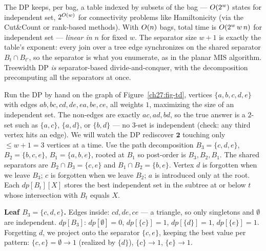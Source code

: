 \begin{complexitybox}
The DP keeps, per bag, a table indexed by subsets of the bag --- $O(2^{w})$ states for independent set, $2^{O(w)}$ for connectivity problems like Hamiltonicity (via the Cut\&Count or rank-based methods). With $O(n)$ bags, total time is $O(2^{w}\,w\,n)$ for independent set --- \emph{linear in $n$} for fixed $w$. The separator size $w+1$ is exactly the table's exponent: every join over a tree edge synchronizes on the shared separator $B_t\cap B_{t'}$, so the separator is what you enumerate, as in the planar MIS algorithm. Treewidth DP \emph{is} separator-based divide-and-conquer, with the decomposition precomputing all the separators at once.
\end{complexitybox}

\begin{labbox}
Run the DP by hand on the graph of Figure~\ref{ch27:fig-td}, vertices $\{a,b,c,d,e\}$ with edges $ab,bc,cd,de,ea,be,ce$, all weights $1$, maximizing the size of an independent set. The non-edges are exactly $ac,ad,bd$, so the true answer is a $2$-set such as $\{a,c\}$, $\{a,d\}$, or $\{b,d\}$ --- no $3$-set is independent (check: any third vertex hits an edge). We will watch the DP rediscover $\mathbf 2$ touching only $\le w+1=3$ vertices at a time. Use the path decomposition $B_3=\{c,d,e\}$, $B_2=\{b,c,e\}$, $B_1=\{a,b,e\}$, rooted at $B_1$ so post-order is $B_3,B_2,B_1$. The shared separators are $B_2\cap B_3=\{c,e\}$ and $B_1\cap B_2=\{b,e\}$. Vertex $d$ is forgotten when we leave $B_3$; $c$ is forgotten when we leave $B_2$; $a$ is introduced only at the root. Each $\textit{dp}[B_t][X]$ stores the best independent set in the subtree at or below $t$ whose intersection with $B_t$ equals $X$.

\textbf{Leaf $B_3=\{c,d,e\}$.} Edges inside: $cd,de,ce$ --- a triangle, so only singletons and $\emptyset$ are independent. $\textit{dp}[B_3]$: $\textit{dp}[\emptyset]=0$, $\textit{dp}[\{c\}]=1$, $\textit{dp}[\{d\}]=1$, $\textit{dp}[\{e\}]=1$. Forgetting $d$, we project onto the separator $\{c,e\}$, keeping the best value per pattern: $\{c,e\}{=}\emptyset\to1$ (realized by $\{d\}$), $\{c\}\to1$, $\{e\}\to1$.


\end{labbox}
